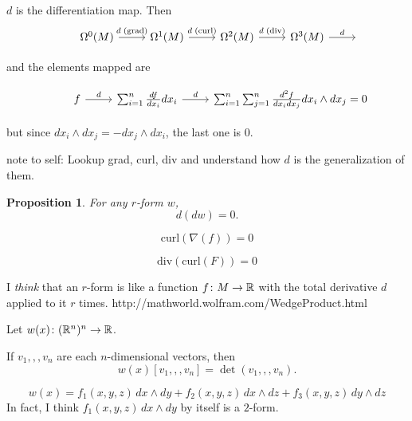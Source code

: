 \documentclass[11pt]{amsbook}
\theoremstyle{mystyle} %
\newtheorem{propo}[thm]{Proposition}
\numberwithin{thm}{section}
\newcommand{\grad}{\nabla}
\begin{document}
\begin{example}
	$d$ is the differentiation map. Then
	$$\begin{tikzcd}
	 	& \Omega^0(M) \arrow[r, "d \;\text{(grad)}"] & \Omega^1(M) \arrow[r, "d \;\text{(curl)}"] & \Omega^2(M) \arrow[r, "d \;\text{(div)}"] & \Omega^3(M) \arrow[r, "d"] &\hphantom{}
	\end{tikzcd}$$

	and the elements mapped are

	$$\begin{tikzcd}
	 	& f \arrow[r, "d"] & \sum_{i=1}^{n} \frac{df}{dx_i} dx_i \arrow[r, "d"] & \sum_{i=1}^{n} \sum_{j=1}^{n} \frac{d^2f}{dx_i dx_j} dx_i \wedge dx_j = 0
	\end{tikzcd}$$

	but since $dx_i \wedge dx_j = -dx_j \wedge dx_i$, the last one is 0.

	note to self: Lookup grad, curl, div and understand how $d$ is the generalization of them.
\end{example}


\begin{propo}
    For any $r$-form $w$,
	$$d(dw) = 0.$$
\end{propo}
\begin{example}
	$$\text{curl}(\grad(f)) = 0$$
\end{example}
\begin{example}
	$$\text{div}(\text{curl}(F)) = 0$$
\end{example}

\begin{example}
	I \emph{think} that an $r$-form is like a function $f\colon M \to {\mathbb R}$ with the total derivative $d$ applied to it $r$ times.
	http://mathworld.wolfram.com/WedgeProduct.html
\end{example}

\begin{example}
	Let $w(x) \colon ({\mathbb R}^n)^n \to {\mathbb R}$.

	If $v_1,,,v_n$ are each $n$-dimensional vectors, then
	$$w(x)[v_1,,,v_n] = \det(v_1,,,v_n).$$	%
\end{example}

\begin{example}[2-forms]
	$$w(x) = f_1(x,y,z)\,dx \wedge dy + f_2(x,y,z)\,dx \wedge dz + f_3(x,y,z)\,dy \wedge dz$$
	In fact, I think $f_1(x,y,z)\,dx \wedge dy$ by itself is a $2$-form.	%
\end{example}
\end{document}
